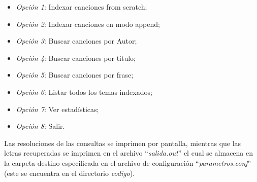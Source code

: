 \documentclass{article}
\begin{document}
	\begin{itemize}
	\itemsep=5pt \topsep=0pt \partopsep=0pt \parskip=0pt \parsep=0pt

		\item \textit{Opción 1}: Indexar canciones from scratch;
		\item \textit{Opción 2}: Indexar canciones en modo append;
		\item \textit{Opción 3}: Buscar canciones por Autor;
		\item \textit{Opción 4}: Buscar canciones por titulo;
		\item \textit{Opción 5}: Buscar canciones por frase;
		\item \textit{Opción 6}: Listar todos los temas indexados;
		\item \textit{Opción 7}: Ver estadísticas;
		\item \textit{Opción 8}: Salir.

	\end{itemize}
	\medskip


	Las resoluciones de las consultas se imprimen por pantalla, mientras que las letras recuperadas se imprimen en el archivo ``\textit{salida.out}'' el cual se almacena en la carpeta destino especificada en el archivo de configuración ``\textit{parametros.conf}'' (este se encuentra en el directorio \textit{codigo}).
\bigskip
\end{document}
